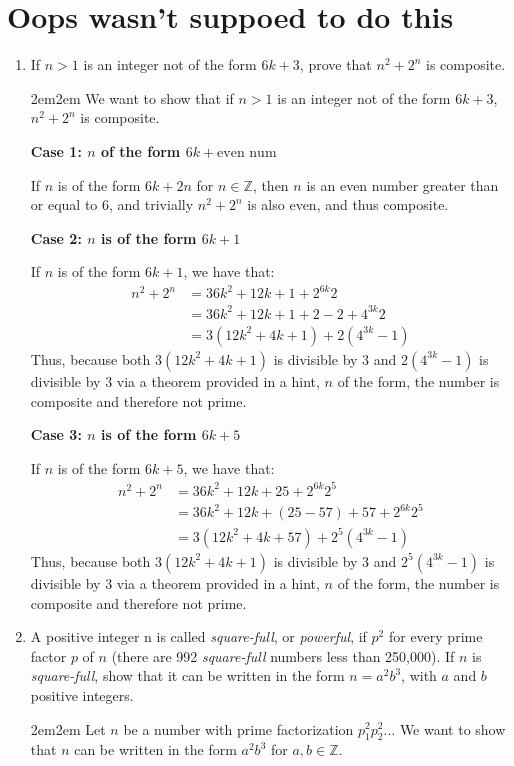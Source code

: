 \documentclass[10pt,oneside]{book}
\newcommand{\Z}{\mathbb{Z}}\newcommand{\R}{\mathbb{R}}\newcommand{\N}{\mathbb{N}}
\newcommand{\gspc}{\vspace{0.13cm}} %
\newcommand{\gline}{\gspc\\} %
\newcommand{\centerit}[1]{{\begin{center} #1 \end{center}}}
\let\endoldproof\endproof
\renewenvironment{proof}[1][\proofname]
  {\vspace{0.2cm}\begin{adjustwidth}{2em}{2em}
   \oldproof[#1]}
  {\endoldproof
\end{adjustwidth}}
\begin{document}
\section*{Oops wasn't suppoed to do this}
\begin{enumerate}
	\item [13.] If $n > 1$ is an integer not of the form $6k+3$, prove that $n^2 + 2^n$ is composite.
	\begin{proof}
		We want to show that if $n > 1$ is an integer not of the form $6k+3$, $n^2 + 2^n$ is composite.
		\centerit{\textbf{Case 1: $n$ of the form $6k+\text{even num}$}}
		If $n$ is of the form $6k + 2n$ for $n\in \Z$, then $n$ is an even number greater than or equal to 6, and trivially $n^2 + 2^n$ is also even, and thus composite.
		\centerit{\textbf{Case 2: $n$ is of the form $6k+1$}}
		If $n$ is of the form $6k+1$, we have that:
		\begin{align*}
			n^2 + 2^n &= 36k^2 + 12k + 1 + 2^{6k}2\\
			&= 36k^2 + 12k +1+2-2+4^{3k}2\\
			&= 3(12k^2+4k+1)+2(4^{3k}-1)
		\end{align*}
		Thus, because both $3(12k^2+4k+1)$ is divisible by 3 and $2(4^{3k}-1)$ is divisible by 3 via a theorem provided in a hint, $n$ of the form, the number is composite and therefore not prime.
		\centerit{\textbf{Case 3: $n$ is of the form $6k+5$}}
		If $n$ is of the form $6k+5$, we have that:
		\begin{align*}
			n^2 + 2^n &= 36k^2 + 12k + 25 + 2^{6k}2^5\\
			&= 36k^2 + 12k + (25 - 57) +57+ 2^{6k}2^5\\
			&= 3(12k^2+4k+57)+2^5(4^{3k}-1)
		\end{align*}
		Thus, because both $3(12k^2+4k+1)$ is divisible by 3 and $2^5(4^{3k}-1)$ is divisible by 3 via a theorem provided in a hint, $n$ of the form, the number is composite and therefore not prime.
	\end{proof}
	\item [19] A positive integer n is called \textit{square-full}, or \textit{powerful}, if $p^2$  for every prime factor 
	$p$ of $n$ (there are 992 \textit{square-full} numbers less than 250,000). If $n$ is \textit{square-full}, show that it can be written in the form $n = a^2 b^3$, with $a$ and $b$ positive integers.
	\begin{proof}
		Let $n$ be a number with prime factorization $p_1^2p_2^2\ldots$ We want to show that $n$ can be written in the form $a^2b^3$ for $a,b\in\Z$. \gline

\end{proof}
\end{enumerate}
\end{document}
